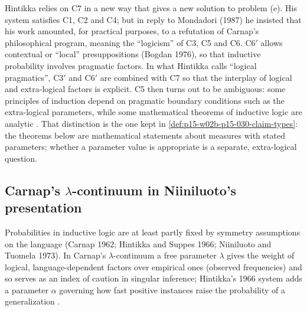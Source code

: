 Hintikka relies on C7 in a new way that gives a new solution to problem
(e). His system satisfies C1, C2 and C4; but in reply to Mondadori (1987)
he insisted that his work amounted, for practical purposes, to a
refutation of Carnap's philosophical program, meaning the ``logicism'' of
C3, C5 and C6. C6\('\) allows contextual or ``local'' presuppositions
(Bogdan 1976), so that inductive probability involves pragmatic factors.
In what Hintikka calls ``logical pragmatics'', C3\('\) and C6\('\) are
combined with C7 so that the interplay of logical and extra-logical
factors is explicit. C5 then turns out to be ambiguous: some principles
of induction depend on pragmatic boundary conditions such as the
extra-logical parameters, while some mathematical theorems of inductive
logic are analytic \cite[pp.~314--315]{Niiniluoto2011HintikkaProgramReading}.
That distinction is the one kept in
\cref{def:p15-w02b-p15-030-claim-types}: the theorems below are
mathematical statements about measures with stated parameters; whether a
parameter value is appropriate is a separate, extra-logical question.

\subsection{Carnap's \(\lambda\)-continuum in Niiniluoto's presentation}
\label{sec:p15-w02b-p15-030-nn-carnap}

Probabilities in inductive logic are at least partly fixed by symmetry
assumptions on the language (Carnap 1962; Hintikka and Suppes 1966;
Niiniluoto and Tuomela 1973). In Carnap's \(\lambda\)-continuum a free
parameter \(\lambda\) gives the weight of logical, language-dependent
factors over empirical ones (observed frequencies) and so serves as an
index of caution in singular inference; Hintikka's 1966 system adds a
parameter \(\alpha\) governing how fast positive instances raise the
probability of a generalization \cite[p.~315]{Niiniluoto2011HintikkaProgramReading}.

